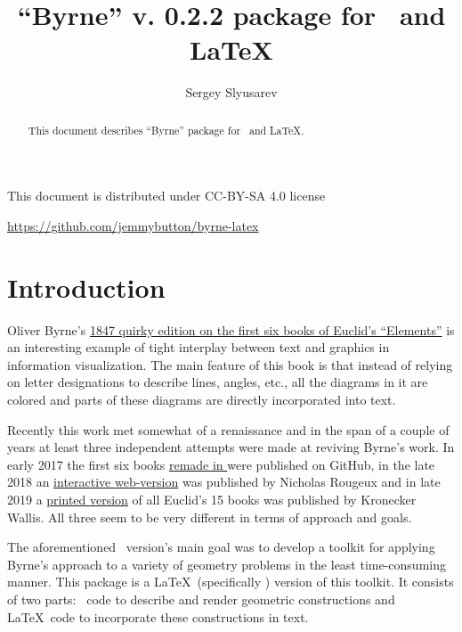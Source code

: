 \documentclass{ltxdoc}
\author{Sergey Slyusarev}
\title{``Byrne'' v. 0.2.2 package for \METAPOST\ and \LaTeX}
\begin{document}
\maketitle

\begin{abstract}
This document describes ``Byrne'' package for \METAPOST\ and \LaTeX.
\end{abstract}

\begin{centering}

This document is distributed under CC-BY-SA 4.0 license 

\ccbysa 

\href{https://github.com/jemmybutton/byrne-latex}{https://github.com/jemmybutton/byrne-latex}

\end{centering}

\section{Introduction}
Oliver Byrne's \href{https://archive.org/details/firstsixbooksofe00byrn/}{1847 quirky edition on the first six books of Euclid's ``Elements''} is an interesting example of tight interplay between text and graphics in information visualization. The main feature of this book is that instead of relying on letter designations to describe lines, angles, etc., all the diagrams in it are colored and parts of these diagrams are directly incorporated into text.

Recently this work met somewhat of a renaissance and in the span of a couple of years at least three independent attempts were made at reviving Byrne's work. In early 2017 the first six books \href{https://github.com/jemmybutton/byrne-euclid/}{remade in \ConTeXt} were published on GitHub, in the late 2018 an \href{https://www.c82.net/euclid/}{interactive web-version} was published by Nicholas Rougeux and in late 2019 a \href{https://www.kroneckerwallis.com/product/euclids-elements-completing-oliver-byrnes-work/}{printed version} of all Euclid's 15 books was published by Kronecker Wallis. All three seem to be very different in terms of approach and goals.

The aforementioned \ConTeXt\ version's main goal was to develop a toolkit for applying Byrne's approach to a variety of geometry problems in the least time-consuming manner. This package is a \LaTeX\ (specifically \LuaLaTeX) version of this toolkit. It consists of two parts: \METAPOST\ code to describe and render geometric constructions and \LaTeX\ code to incorporate these constructions in text.
\end{document}
